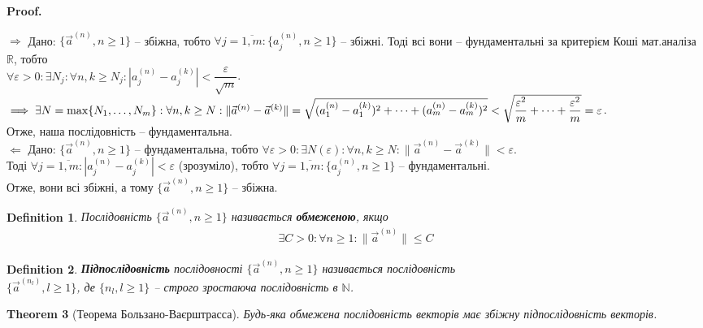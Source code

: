 \documentclass[a4paper, 10pt]{article}
\makeatletter
\def\qed{$\blacksquare$}
\def\rightproof{$\boxed{\Rightarrow}$ }
\def\leftproof{$\boxed{\Leftarrow}$ }
\theoremstyle{theoremdd}
\newtheorem{theorem}{Theorem}[subsection]
\theoremstyle{theoremdd}
\theoremstyle{theoremdd}
\newtheorem{definition}[theorem]{Definition}
\theoremstyle{theoremdd}
\theoremstyle{theoremdd}
\theoremstyle{theoremdd}
\theoremstyle{theoremdd}
\theoremstyle{theoremdd}
\theoremstyle{theoremdd}
\renewenvironment{proof}[1][Proof.\\]{\par
\pushQED{\hfill \qed}%
\normalfont \topsep6\p@\@plus6\p@\relax
\trivlist
\item\relax
{\bfseries
#1\@addpunct{.}}\hspace\labelsep\ignorespaces
}{%
\popQED\endtrivlist\@endpefalse
}
\newcommand\Norm[1]{\|#1\|}
\makeatother
\begin{document}
\begin{proof}
\rightproof Дано: $\{\vec{a}^{(n)}, n \geq 1 \}$ -- збіжна, тобто $\forall j = \overline{1,m}: \{a_j^{(n)}, n \geq 1\}$ -- збіжні. Тоді всі вони -- фундаментальні за критерієм Коші мат.аналіза $\mathbb{R}$, тобто \\ $\forall \varepsilon > 0: \exists N_j: \forall n,k \geq N_j: |a_j^{(n)} - a_j^{(k)}| < \dfrac{\varepsilon}{\sqrt{m}}$.\\
$\implies \exists N = \max\{N_1,\dots,N_m\}: \forall n,k \geq N: \\ \Norm{\vec{a}^{(n)} - \vec{a}^{(k)}} = \sqrt{(a_1^{(n)} - a_1^{(k)})^2 + \dots + (a_m^{(n)} - a_m^{(k)})^2} < \sqrt{\dfrac{\varepsilon^2}{m} + \dots + \dfrac{\varepsilon^2}{m}} = \varepsilon$.\\
Отже, наша послідовність -- фундаментальна.
\bigskip \\
\leftproof Дано: $\{\vec{a}^{(n)}, n \geq 1 \}$ -- фундаментальна, тобто $\forall \varepsilon > 0: \exists N(\varepsilon): \forall n, k \geq N: \Norm{\vec{a}^{(n)} - \vec{a}^{(k)}} < \varepsilon$.\\
Тоді $\forall j = \overline{1,m}: |a_j^{(n)} - a_j^{(k)}| < \varepsilon$ (зрозуміло), тобто $\forall j = \overline{1,m}: \{a_j^{(n)}, n \geq 1\}$ -- фундаментальні.\\
Отже, вони всі збіжні, а тому $\{\vec{a}^{(n)}, n \geq 1 \}$ -- збіжна.
\end{proof}

\begin{definition}
Послідовність $\{\vec{a}^{(n)}, n \geq 1 \}$ називається \textbf{обмеженою}, якщо
\begin{align*}
\exists C > 0: \forall n \geq 1: \Norm{\vec{a}^{(n)}} \leq C
\end{align*}
\end{definition}

\begin{definition}
\textbf{Підпослідовність} послідовності $\{\vec{a}^{(n)}, n \geq 1 \}$ називається послідовність \\ $\{\vec{a}^{(n_l)}, l \geq 1 \}$, де $\{n_l, l \geq 1 \}$ -- строго зростаюча послідовність в $\mathbb{N}$.
\end{definition}

\begin{theorem}[Теорема Бользано-Ваєрштрасса]
Будь-яка обмежена послідовність векторів має збіжну підпослідовність векторів.
\end{theorem}
\end{document}
